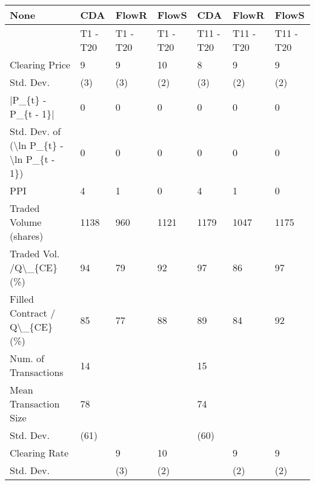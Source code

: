 \begin{tabular}{lllllll}
\hline
 None                                                      & CDA      & FlowR    & FlowS    & CDA       & FlowR     & FlowS     \\
\hline
                                                           & T1 - T20 & T1 - T20 & T1 - T20 & T11 - T20 & T11 - T20 & T11 - T20 \\
 Clearing Price                                            & 9        & 9        & 10       & 8         & 9         & 9         \\
 Std. Dev.                                                 & (3)      & (3)      & (2)      & (3)       & (2)       & (2)       \\
 |P\_\{t\} - P\_\{t - 1\}|                                       & 0        & 0        & 0        & 0         & 0         & 0         \\
 Std. Dev. of (\textbackslash{}ln P\_\{t\} - \textbackslash{}ln P\_\{t - 1\})                  & 0        & 0        & 0        & 0         & 0         & 0         \\
 PPI                                                       & 4        & 1        & 0        & 4         & 1         & 0         \\
 Traded Volume (shares)                                    & 1138     & 960      & 1121     & 1179      & 1047      & 1175      \\
 Traded Vol. /Q\textbackslash{}\_\{CE\} (\%)                                  & 94       & 79       & 92       & 97        & 86        & 97        \\
 Filled Contract / Q\textbackslash{}\_\{CE\} (\%)                             & 85       & 77       & 88       & 89        & 84        & 92        \\
 Num. of Transactions                                      & 14       &          &          & 15        &           &           \\
 Mean Transaction Size                                     & 78       &          &          & 74        &           &           \\
 Std. Dev.                                                 & (61)     &          &          & (60)      &           &           \\
 Clearing Rate                                             &          & 9        & 10       &           & 9         & 9         \\
 Std. Dev.                                                 &          & (3)      & (2)      &           & (2)       & (2)       \\

\end{tabular}
